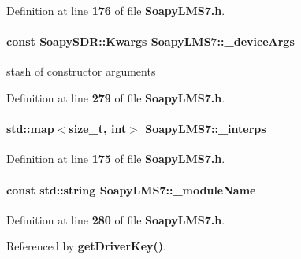Definition at line {\bf 176} of file {\bf Soapy\+L\+M\+S7.\+h}.

\paragraph[{\+\_\+device\+Args}]{\setlength{\rightskip}{0pt plus 5cm}const Soapy\+S\+D\+R\+::\+Kwargs Soapy\+L\+M\+S7\+::\+\_\+device\+Args\hspace{0.3cm}{\ttfamily [private]}}\label{classSoapyLMS7_a0dd83336fa71c792cf1572523cdcb2cb}


stash of constructor arguments 



Definition at line {\bf 279} of file {\bf Soapy\+L\+M\+S7.\+h}.

\paragraph[{\+\_\+interps}]{\setlength{\rightskip}{0pt plus 5cm}std\+::map$<$size\+\_\+t, {\bf int}$>$ Soapy\+L\+M\+S7\+::\+\_\+interps}\label{classSoapyLMS7_ab9dcbc7ae0009e6f9061cf93ae431366}


Definition at line {\bf 175} of file {\bf Soapy\+L\+M\+S7.\+h}.

\paragraph[{\+\_\+module\+Name}]{\setlength{\rightskip}{0pt plus 5cm}const std\+::string Soapy\+L\+M\+S7\+::\+\_\+module\+Name\hspace{0.3cm}{\ttfamily [private]}}\label{classSoapyLMS7_a22ff08b725ee2c079ecc4ccc59048a7e}


Definition at line {\bf 280} of file {\bf Soapy\+L\+M\+S7.\+h}.



Referenced by {\bf get\+Driver\+Key()}.


